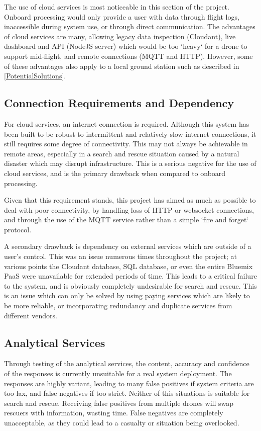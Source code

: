 \documentclass{article}
\begin{document}
The use of cloud services is most noticeable in this section of the project. Onboard processing would only provide a user with data through flight logs, inaccessible during system use, or through direct communication. The advantages of cloud services are many, allowing legacy data inspection (Cloudant), live dashboard and API (NodeJS server) which would be too `heavy` for a drone to support mid-flight, and remote connections (MQTT and HTTP). However, some of these advantages also apply to a local ground station such as described in \ref{PotentialSolutions}.


\subsection{Connection Requirements and Dependency}
For cloud services, an internet connection is required. Although this system has been built to be robust to intermittent and relatively slow internet connections, it still requires some degree of connectivity. This may not always be achievable in remote areas, especially in a search and rescue situation caused by a natural disaster which may disrupt infrastructure. This is a serious negative for the use of cloud services, and is the primary drawback when compared to onboard processing. 

Given that this requirement stands, this project has aimed as much as possible to deal with poor connectivity, by handling loss of HTTP or websocket connections, and through the use of the MQTT service rather than a simple `fire and forget` protocol. 

A secondary drawback is dependency on external services which are outside of a user's control. This was an issue numerous times throughout the project; at various points the Cloudant database, SQL database, or even the entire Bluemix PaaS were unavailable for extended periods of time. This leads to a critical failure to the system, and is obviously completely undesirable for search and rescue. This is an issue which can only be solved by using paying services which are likely to be more reliable, or incorporating redundancy and duplicate services from different vendors.  


\subsection{Analytical Services}
Through testing of the analytical services, the content, accuracy and confidence of the responses is currently unsuitable for a real system deployment. The responses are highly variant, leading to many false positives if system criteria are too lax, and false negatives if too strict. Neither of this situations is suitable for search and rescue. Receiving false positives from multiple drones will swap rescuers with information, wasting time. False negatives are completely unacceptable, as they could lead to a casualty or situation being overlooked.   
\end{document}
